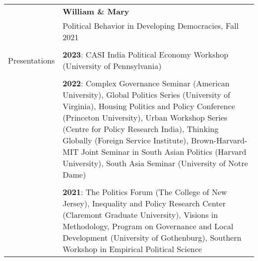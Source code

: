 \documentclass[letterpaper, 10pt]{article}
\begin{document}
\begin{longtable}{p{1in}p{5.5in}}
& \textbf{William \& Mary} \\
&Political Behavior in Developing Democracies, Fall 2021 \\


&\\











{{Presentations}} 
& \textbf{2023}: CASI India Political Economy Workshop (University of Pennsylvania)\\
&\\
& \textbf{2022}: Complex Governance Seminar (American University), Global Politics Series (University of Virginia), Housing Politics and Policy Conference (Princeton University), Urban Workshop Series (Centre for Policy Research India), Thinking Globally (Foreign Service Institute), Brown-Harvard-MIT Joint Seminar in South Asian Politics (Harvard University), South Asia Seminar (University of Notre Dame)\\
&\\

&\textbf{2021}: The Politics Forum (The College of New Jersey), Inequality and Policy Research Center (Claremont Graduate University),  Visions in Methodology, Program on Governance and Local Development (University of Gothenburg), Southern Workshop in Empirical Political Science \\
 

\end{longtable}
\end{document}
